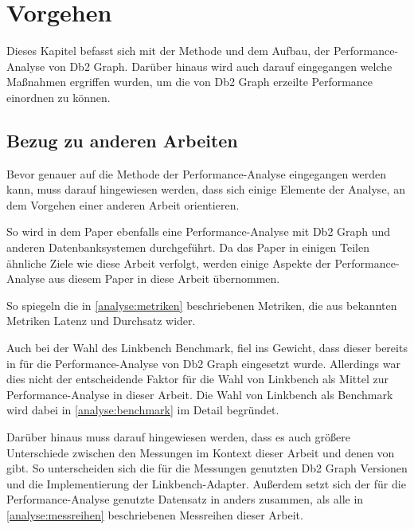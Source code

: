 \chapter{Vorgehen}
\label{vorgehen}
Dieses Kapitel befasst sich mit der Methode und dem Aufbau, der Performance-Analyse von Db2 Graph. Darüber hinaus wird auch darauf eingegangen welche Maßnahmen ergriffen wurden, um die von Db2 Graph  erzeilte Performance einordnen zu können. 

\section{Bezug zu anderen Arbeiten}
Bevor genauer auf die Methode der Performance-Analyse eingegangen werden kann, muss darauf hingewiesen werden, dass sich einige Elemente der Analyse, an dem Vorgehen einer anderen Arbeit orientieren. 

So wird in dem Paper \cite{sigmod_tian} ebenfalls eine Performance-Analyse mit Db2 Graph und anderen Datenbanksystemen durchgeführt. Da das Paper \cite{sigmod_tian} in einigen Teilen ähnliche Ziele wie diese Arbeit verfolgt, werden einige Aspekte der Performance-Analyse aus diesem Paper in diese Arbeit übernommen. 

So spiegeln die in \autoref{analyse:metriken} beschriebenen Metriken, die aus \cite{sigmod_tian} bekannten Metriken Latenz und Durchsatz wider.

Auch bei der Wahl des Linkbench Benchmark, fiel ins Gewicht, dass dieser bereits in \cite{sigmod_tian} für die Performance-Analyse von Db2 Graph eingesetzt wurde. Allerdings war dies nicht der entscheidende Faktor für die Wahl von Linkbench als Mittel zur Performance-Analyse in dieser Arbeit. Die Wahl von Linkbench als Benchmark wird dabei in \autoref{analyse:benchmark} im Detail begründet. 

Darüber hinaus muss darauf hingewiesen werden, dass es auch größere Unterschiede zwischen den Messungen im Kontext dieser Arbeit und denen von \cite{sigmod_tian} gibt. So unterscheiden sich die für die Messungen genutzten Db2 Graph Versionen und die Implementierung der Linkbench-Adapter. Außerdem setzt sich der für die Performance-Analyse genutzte Datensatz in \cite{sigmod_tian} anders zusammen, als alle in \autoref{analyse:messreihen} beschriebenen Messreihen dieser Arbeit.

